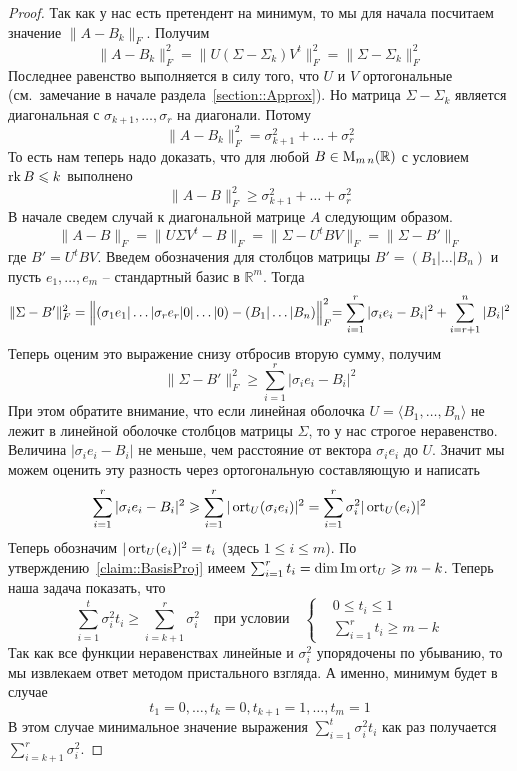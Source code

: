 \begin{proof}
Так как у нас есть претендент на минимум, то мы для начала посчитаем значение $\|A-B_k\|_F$.
Получим
\[
\|A-B_k\|_F^2 = \|U(\Sigma - \Sigma_k)V^t\|_F^2 =  \|\Sigma - \Sigma_k\|_F^2
\]
Последнее равенство выполняется в силу того, что $U$ и $V$ ортогональные (см.~замечание в начале раздела~\ref{section::Approx}).
Но матрица $\Sigma-\Sigma_k$ является диагональная с $\sigma_{k+1},\ldots,\sigma_r$ на диагонали.
Потому
\[
\|A-B_k\|_F^2  = \sigma_{k+1}^2 +\ldots + \sigma_r^2
\]
То есть нам теперь надо доказать, что для любой $B\in \operatorname{M}_{m\,n}(\mathbb R)$ с условием $\operatorname{rk} B\leqslant k$ выполнено
\[
\|A - B\|_F^2\geqslant \sigma_{k+1}^2 +\ldots + \sigma_r^2
\]
В начале сведем случай к диагональной матрице $A$ следующим образом.
\[
\|A - B\|_F = \|U \Sigma V^t - B\|_F = \|\Sigma - U^t B V\|_F = \|\Sigma - B'\|_F
\]
где $B' = U^t B V$.
Введем обозначения для столбцов матрицы $B' = (B_1|\ldots|B_n)$ и пусть $e_1,\ldots,e_m$ -- стандартный базис в $\mathbb R^m$.
Тогда
\[
 \|\Sigma - B'\|^2_F = \Bigl\| (\sigma_1 e_1|\ldots|\sigma_r e_r|0 |\ldots|0) - (B_1|\ldots|B_n)\Bigl\|^2_F = \sum_{i=1}^r |\sigma_i e_i - B_i|^2 + \sum_{i=r+1}^n|B_i|^2
\]
Теперь оценим это выражение снизу отбросив вторую сумму, получим
\[
 \|\Sigma - B'\|^2_F\geqslant  \sum_{i=1}^r |\sigma_i e_i - B_i|^2
\]
При этом обратите внимание, что если линейная оболочка $U = \langle B_1,\ldots, B_n\rangle $ не лежит в линейной оболочке столбцов матрицы $\Sigma$, то у нас строгое неравенство.
Величина $|\sigma_i e_i - B_i|$ не меньше, чем расстояние от вектора $\sigma_i e_i$ до $U$.
Значит мы можем оценить эту разность через ортогональную составляющую и написать
\[
 \sum_{i=1}^r |\sigma_i e_i - B_i|^2 \geqslant \sum_{i=1}^r |\operatorname{ort}_U(\sigma_i e_i)|^2 =  \sum_{i=1}^r \sigma^2_i| \operatorname{ort}_U(e_i)|^2 
\]
Теперь обозначим $|\operatorname{ort}_U(e_i)|^2 = t_i$ (здесь $1\leqslant i \leqslant m$).
По утверждению~\ref{claim::BasisProj} имеем $\sum_{i=1}^r t_i = \dim \operatorname{Im} \operatorname{ort}_U \geqslant m - k$.
Теперь наша задача показать, что
\[
\sum_{i=1}^t \sigma_i^2 t_i\geqslant \sum_{i = k+1}^r\sigma_i^2\quad\text{при условии}\quad
\left\{
\begin{aligned}
&0 \leqslant t_i \leqslant 1\\
&\sum_{i=1}^r t_i \geqslant m - k
\end{aligned}
\right.
\]
Так как все функции неравенствах линейные и $\sigma_i^2$ упорядочены по убыванию, то мы извлекаем ответ методом пристального взгляда.
А именно, минимум будет в случае
\[
t_1 = 0,\ldots,t_k = 0, t_{k+1} = 1,\ldots,t_m = 1
\]
В этом случае минимальное значение выражения $\sum_{i=1}^t \sigma_i^2 t_i$ как раз получается $ \sum_{i = k+1}^r\sigma_i^2$.
\end{proof}

